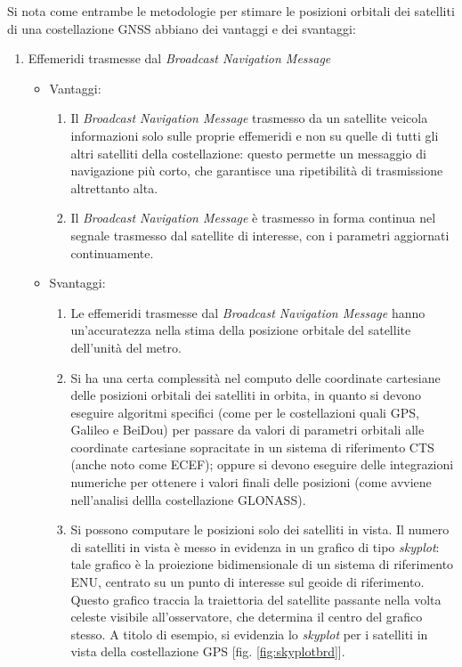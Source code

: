 \documentclass[a4paper,11pt,twoside]{book}
\begin{document}
	Si nota come entrambe le metodologie per stimare le posizioni orbitali dei satelliti di una costellazione GNSS abbiano dei vantaggi e dei svantaggi:
	
	\begin{enumerate}
		\item Effemeridi trasmesse dal \textit{Broadcast Navigation Message}
		
		\begin{itemize}[-]
			\item Vantaggi:
			
			\begin{enumerate}
				\item Il \textit{Broadcast Navigation Message} trasmesso da un satellite veicola informazioni solo sulle proprie effemeridi e non su quelle di tutti gli altri satelliti della costellazione: questo permette un messaggio di navigazione più corto, che garantisce una ripetibilità di trasmissione altrettanto alta.
				
				\item Il \textit{Broadcast Navigation Message} è trasmesso in forma continua nel segnale trasmesso dal satellite di interesse, con i parametri aggiornati continuamente.
			\end{enumerate}
		
			\item Svantaggi:
			
			\begin{enumerate}
				\item Le effemeridi trasmesse dal \textit{Broadcast Navigation Message} hanno un'accuratezza nella stima della posizione orbitale del satellite dell'unità del metro.
				
				\item Si ha una certa complessità nel computo delle coordinate cartesiane delle posizioni orbitali dei satelliti in orbita, in quanto si devono eseguire algoritmi specifici (come per le costellazioni quali GPS, Galileo e BeiDou) per passare da valori di parametri orbitali alle coordinate cartesiane sopracitate in un sistema di riferimento CTS (anche noto come ECEF); oppure si devono eseguire delle integrazioni numeriche per ottenere i valori finali delle posizioni (come avviene nell'analisi dellla costellazione GLONASS).
				
				\item Si possono computare le posizioni solo dei satelliti in vista. Il numero di satelliti in vista è messo in evidenza in un grafico di tipo \textit{skyplot}: tale grafico è la proiezione bidimensionale di un sistema di riferimento ENU, centrato su un punto di interesse sul geoide di riferimento. Questo grafico traccia la traiettoria del satellite passante nella volta celeste visibile all'osservatore, che determina il centro del grafico stesso. A titolo di esempio, si evidenzia lo \textit{skyplot} per i satelliti in vista della costellazione GPS [fig. \ref{fig:skyplotbrd}].
				

\end{enumerate}
\end{itemize}
\end{enumerate}
\end{document}
